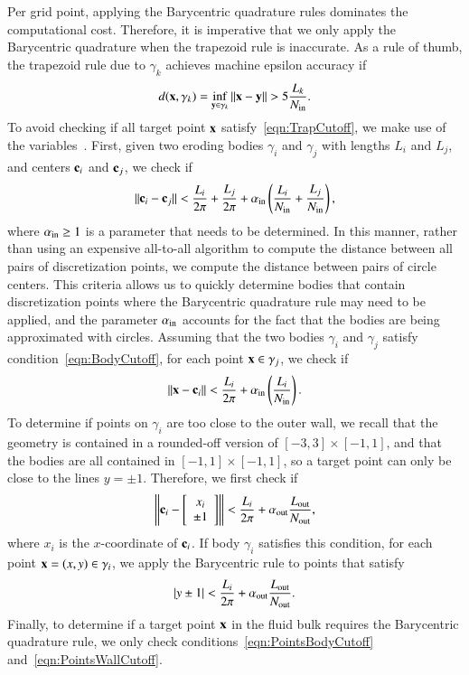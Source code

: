 \documentclass[preprint,10pt]{elsarticle}
\begin{document}
Per grid point, applying the Barycentric quadrature rules dominates the
computational cost. Therefore, it is imperative that we only apply the
Barycentric quadrature when the trapezoid rule is inaccurate.  As a rule
of thumb, the trapezoid rule due to $\gamma_k$ achieves machine epsilon
accuracy if~\cite{bar2014}
\begin{align}
  \label{eqn:TrapCutoff}
  d({\mathbf{x}},\gamma_k) = \inf_{{\mathbf{y}} \in \gamma_k} \|{\mathbf{x}} - {\mathbf{y}}\| > 
    5 \frac{L_k}{N_{\mathrm{in}}}.
\end{align}
To avoid checking if all target point ${\mathbf{x}}$
satisfy~\eqref{eqn:TrapCutoff}, we make use of the {\thL}
variables~\cite{hou-low-she1994}.  First, given two eroding bodies $\gamma_i$ and $\gamma_j$ with
lengths $L_i$ and $L_j$, and centers ${\mathbf{c}}_i$ and ${\mathbf{c}}_j$, we check if
\begin{align}
  \label{eqn:BodyCutoff}
  \|{\mathbf{c}}_i - {\mathbf{c}}_j\| < \frac{L_i}{2\pi} + \frac{L_j}{2\pi} + 
    \alpha_{\mathrm{in}} \left(\frac{L_i}{N_{\mathrm{in}}} + \frac{L_j}{N_{\mathrm{in}}} \right),
\end{align}
where $\alpha_{\mathrm{in}} \geq 1$ is a parameter that needs to be determined.
In this manner, rather than using an expensive all-to-all algorithm to
compute the distance between all pairs of discretization points, we
compute the distance between pairs of circle centers.  This criteria
allows us to quickly determine bodies that contain discretization points
where the Barycentric quadrature rule may need to be applied, and the
parameter $\alpha_{\mathrm{in}}$ accounts for the fact that the bodies are being
approximated with circles.  Assuming that the two bodies $\gamma_i$ and
$\gamma_j$ satisfy condition~\eqref{eqn:BodyCutoff}, for each point ${\mathbf{x}}
\in \gamma_j$, we check if
\begin{align}
  \label{eqn:PointsBodyCutoff}
  \|{\mathbf{x}} - {\mathbf{c}}_i\| < \frac{L_i}{2\pi}
+ \alpha_{\mathrm{in}} \left(\frac{L_i}{N_{\mathrm{in}}} \right).
\end{align}
To determine if points on $\gamma_i$ are too close to the outer wall, we
recall that the geometry is contained in a rounded-off version of
$[-3,3] \times [-1,1]$, and that the bodies are all contained in $[-1,1]
\times [-1,1]$, so a target point can only be close to the lines $y =
\pm 1$. Therefore, we first check if
\begin{align}
  \left\|{\mathbf{c}}_i - \left[
    \begin{array}{c}
      x_i \\ \pm 1
    \end{array}
    \right]
  \right\| < \frac{L_i}{2 \pi} + \alpha_{\mathrm{out}} \frac{L_{\mathrm{out}}}{N_{\mathrm{out}}},
\end{align}
where $x_i$ is the $x$-coordinate of ${\mathbf{c}}_i$. If body $\gamma_i$
satisfies this condition, for each point ${\mathbf{x}}=(x,y) \in \gamma_i$, we
apply the Barycentric rule to points that satisfy
\begin{align}
  \label{eqn:PointsWallCutoff}
  |y \pm 1| < \frac{L_i}{2 \pi} +\alpha_{\mathrm{out}} \frac{L_{\mathrm{out}}}{N_{\mathrm{out}}}.
\end{align}
Finally, to determine if a target point ${\mathbf{x}}$ in the fluid bulk requires
the Barycentric quadrature rule, we only check
conditions~\eqref{eqn:PointsBodyCutoff}
and~\eqref{eqn:PointsWallCutoff}.  
\end{document}
